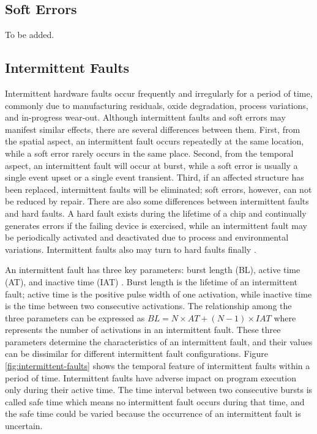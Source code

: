 \subsection{Soft Errors}
To be added.

\subsection{Intermittent Faults}
Intermittent hardware faults occur frequently and irregularly for a period of time, commonly due to manufacturing residuals, oxide degradation, process variations, and in-progress wear-out. Although intermittent faults and soft errors may manifest similar effects, there are several differences between them. First, from the spatial aspect, an intermittent fault occurs repeatedly at the same location, while a soft error rarely occurs in the same place. Second, from the temporal aspect, an intermittent fault will occur at burst, while a soft error is usually a single event upset or a single event transient. Third, if an affected structure has been replaced, intermittent faults will be eliminated; soft errors, however, can not be reduced by repair. There are also some differences between intermittent faults and hard faults. A hard fault exists during the lifetime of a chip and continually generates errors if the failing device is exercised, while an intermittent fault may be periodically activated and deactivated due to process and environmental variations. Intermittent faults also may turn to hard faults finally \cite{smolens2007detecting}.

An intermittent fault has three key parameters: burst length (BL), active time (AT), and inactive time (IAT) \cite{gracia2008analysis}. Burst length is the lifetime of an intermittent fault; active time is the positive pulse width of one activation, while inactive time is the time between two consecutive activations. The relationship among the three parameters can be expressed as $BL=N \times {AT} + (N - 1) \times IAT$ where represents the number of activations in an intermittent fault. These three parameters determine the characteristics of an intermittent fault, and their values can be dissimilar for different intermittent fault configurations. Figure \ref{fig:intermittent-faults} shows the temporal feature of intermittent faults within a period of time. Intermittent faults have adverse impact on program execution only during their active time. The time interval between two consecutive bursts is called safe time which means no intermittent fault occurs during that time, and the safe time could be varied because the occurrence of an intermittent fault is uncertain.

